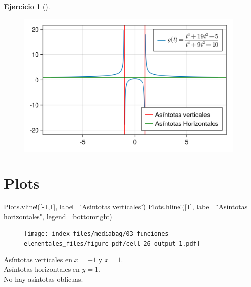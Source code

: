 \documentclass[
  a4paper,
]{scrreport}
\newenvironment{Shaded}{\begin{snugshade}}{\end{snugshade}}
\newcommand{\FloatTok}[1]{\textcolor[rgb]{0.68,0.00,0.00}{#1}}
\newcommand{\FunctionTok}[1]{\textcolor[rgb]{0.28,0.35,0.67}{#1}}
\newcommand{\NormalTok}[1]{\textcolor[rgb]{0.00,0.23,0.31}{#1}}
\newcommand{\OperatorTok}[1]{\textcolor[rgb]{0.37,0.37,0.37}{#1}}
\newcommand{\StringTok}[1]{\textcolor[rgb]{0.13,0.47,0.30}{#1}}
\theoremstyle{definition}
\newtheorem{exercise}{Ejercicio}[chapter]
\theoremstyle{remark}
\begin{document}
\begin{exercise}[]
\begin{tcolorbox}
\begin{figure}[H]
{\centering \includegraphics{03-funciones-elementales_files/figure-pdf/cell-25-output-1.png}

}

\end{figure}

\section{Plots}

\begin{Shaded}
\begin{Highlighting}[]
\NormalTok{Plots.}\FunctionTok{vline!}\NormalTok{([}\OperatorTok{{-}}\FloatTok{1}\NormalTok{,}\FloatTok{1}\NormalTok{], label}\OperatorTok{=}\StringTok{"Asíntotas verticales"}\NormalTok{)}
\NormalTok{Plots.}\FunctionTok{hline!}\NormalTok{([}\FloatTok{1}\NormalTok{], label}\OperatorTok{=}\StringTok{"Asíntotas horizontales"}\NormalTok{, legend}\OperatorTok{=:}\NormalTok{bottomright)}
\end{Highlighting}
\end{Shaded}

\begin{figure}[H]

{\centering \texttt{[image: index\_files/mediabag/03-funciones-elementales\_files/figure-pdf/cell-26-output-1.pdf]}

}

\end{figure}

Asíntotas verticales en \(x=-1\) y \(x=1\).\\
Asíntotas horizontales en \(y=1\).\\
No hay asíntotas oblicuas.

\end{tcolorbox}


\end{exercise}
\end{document}
